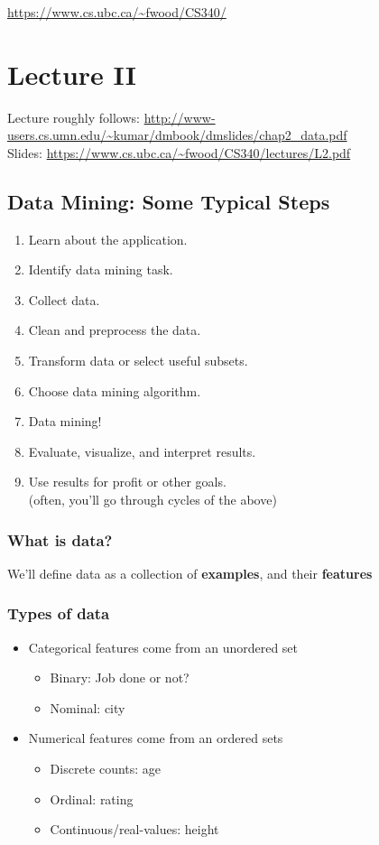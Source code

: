 \documentclass{article}
\begin{document}
	
\noindent \url{https://www.cs.ubc.ca/~fwood/CS340/}

\section*{Lecture II}
Lecture roughly follows: \url{http://www-users.cs.umn.edu/~kumar/dmbook/dmslides/chap2_data.pdf} \\
Slides: \url{https://www.cs.ubc.ca/~fwood/CS340/lectures/L2.pdf}\\

\subsection*{Data Mining: Some Typical Steps}

\begin{enumerate}
	\item Learn about the application.
	\item Identify data mining task.
	\item Collect data.
	\item Clean and preprocess the data.
	\item Transform data or select useful subsets.
\item Choose data mining algorithm.
\item Data mining!
\item Evaluate, visualize, and interpret results.
\item Use results for profit or other goals.\\
	(often, you’ll go through cycles of the above)
\end{enumerate}

\subsubsection*{What is data?}
We'll define data as a collection of {\bf examples}, and their {\bf features} 

\subsubsection*{Types of data}
\begin{itemize}
	\item Categorical features come from an unordered set
	\begin{itemize}
		\item Binary: Job done or not?
		\item Nominal: city
	\end{itemize}
	\item Numerical features come from an ordered sets
	\begin{itemize}
		\item Discrete counts: age
		\item Ordinal: rating
		\item Continuous/real-values: height
	\end{itemize}
\end{itemize}
\end{document}

